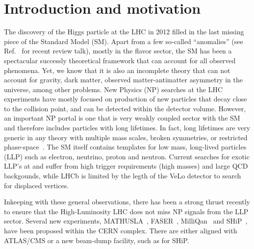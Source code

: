 \section{Introduction and motivation}
\label{sec:Introduction}



The discovery of the Higgs particle at the LHC in 2012 filled in the last missing piece of the Standard Model (SM). Apart from a few so-called ``anomalies'' (see Ref.~\cite{pich_talk} for recent review talk), mostly in the flavor sector, the SM has been a spectacular successly theoretical framework that can account for all observed phenomena. Yet, we know that it is also an incomplete theory that can not account for gravity, dark matter, observed matter-antimatter asymmetry in the universe, among other problems. New Physics (NP) searches at the LHC experiments have mostly focused on production of new particles that decay close to the collision point, and can be detected within the detector volume. However, an important NP portal is one that is very weakly coupled sector with the SM and therefore includes particles with long lifetimes. In fact, long lifetimes are very generic in any theory with multiple mass scales, broken symmetries, or restricted phase-space~\cite{Curtin:2018mvb}. The SM itself contains templates for low mass, long-lived particles (LLP) such as electron, neutrino, proton and neutron. Current searches for exotic LLP's at \atlas and \cms suffer from high \pt trigger requirements (high masses) and large QCD backgounds, while LHCb is limited by the legth of the VeLo detector to search for displaced vertices. 

Inkeeping with these general observations, there has been a strong thrust recently to ensure that the High-Luminosity LHC does not miss NP signals from the LLP sector. Several new experiments, MATHUSLA~\cite{Chou:2016lxi}, FASER~\cite{Feng:2017uoz}, MilliQan~\cite{Ball:2016zrp} and SHiP~\cite{Alekhin:2015byh}, have been proposed within the CERN complex. There are either aligned with ATLAS/CMS or a new beam-dump facility, such as for SHiP.

